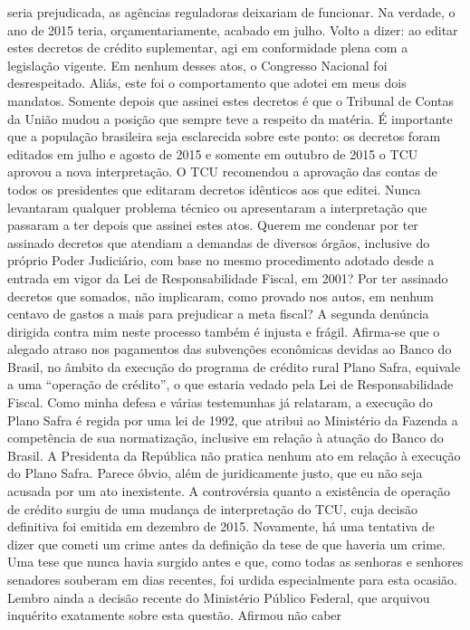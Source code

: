 seria prejudicada, as agências reguladoras deixariam de funcionar. Na
verdade, o ano de 2015 teria, orçamentariamente, acabado em julho. Volto
a dizer: ao editar estes decretos de crédito suplementar, agi em
conformidade plena com a legislação vigente. Em nenhum desses atos, o
Congresso Nacional foi desrespeitado. Aliás, este foi o comportamento
que adotei em meus dois mandatos. Somente depois que assinei estes
decretos é que o Tribunal de Contas da União mudou a posição que sempre
teve a respeito da matéria. É importante que a população brasileira seja
esclarecida sobre este ponto: os decretos foram editados em julho e
agosto de 2015 e somente em outubro de 2015 o TCU aprovou a nova
interpretação. O TCU recomendou a aprovação das contas de todos os
presidentes que editaram decretos idênticos aos que editei. Nunca
levantaram qualquer problema técnico ou apresentaram a interpretação que
passaram a ter depois que assinei estes atos. Querem me condenar por ter
assinado decretos que atendiam a demandas de diversos órgãos, inclusive
do próprio Poder Judiciário, com base no mesmo procedimento adotado
desde a entrada em vigor da Lei de Responsabilidade Fiscal, em 2001? Por
ter assinado decretos que somados, não implicaram, como provado nos
autos, em nenhum centavo de gastos a mais para prejudicar a meta fiscal?
A segunda denúncia dirigida contra mim neste processo também é injusta e
frágil. Afirma-se que o alegado atraso nos pagamentos das subvenções
econômicas devidas ao Banco do Brasil, no âmbito da execução do programa
de crédito rural Plano Safra, equivale a uma ``operação de crédito'', o
que estaria vedado pela Lei de Responsabilidade Fiscal. Como minha
defesa e várias testemunhas já relataram, a execução do Plano Safra é
regida por uma lei de 1992, que atribui ao Ministério da Fazenda a
competência de sua normatização, inclusive em relação à atuação do Banco
do Brasil. A Presidenta da República não pratica nenhum ato em relação à
execução do Plano Safra. Parece óbvio, além de juridicamente justo, que
eu não seja acusada por um ato inexistente. A controvérsia quanto a
existência de operação de crédito surgiu de uma mudança de interpretação
do TCU, cuja decisão definitiva foi emitida em dezembro de 2015.
Novamente, há uma tentativa de dizer que cometi um crime antes da
definição da tese de que haveria um crime. Uma tese que nunca havia
surgido antes e que, como todas as senhoras e senhores senadores
souberam em dias recentes, foi urdida especialmente para esta ocasião.
Lembro ainda a decisão recente do Ministério Público Federal, que
arquivou inquérito exatamente sobre esta questão. Afirmou não caber
